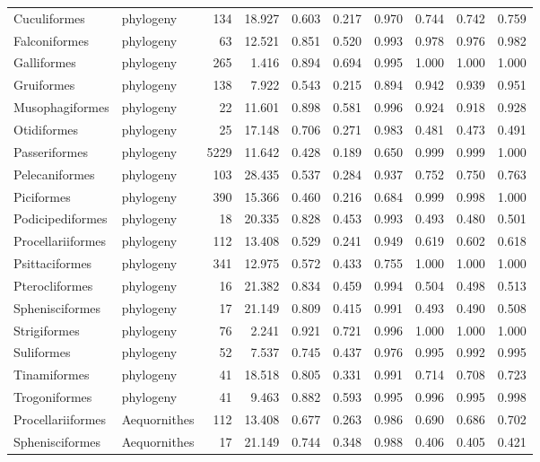 \begin{table}[ht]
\begin{tabular}{llrrrrrrrr}
  Cuculiformes & phylogeny &  134 & 18.927 & 0.603 & 0.217 & 0.970 & 0.744 & 0.742 & 0.759 \\ 
  Falconiformes & phylogeny &   63 & 12.521 & 0.851 & 0.520 & 0.993 & 0.978 & 0.976 & 0.982 \\ 
  Galliformes & phylogeny &  265 & 1.416 & 0.894 & 0.694 & 0.995 & 1.000 & 1.000 & 1.000 \\ 
  Gruiformes & phylogeny &  138 & 7.922 & 0.543 & 0.215 & 0.894 & 0.942 & 0.939 & 0.951 \\ 
  Musophagiformes & phylogeny &   22 & 11.601 & 0.898 & 0.581 & 0.996 & 0.924 & 0.918 & 0.928 \\ 
  Otidiformes & phylogeny &   25 & 17.148 & 0.706 & 0.271 & 0.983 & 0.481 & 0.473 & 0.491 \\ 
  Passeriformes & phylogeny & 5229 & 11.642 & 0.428 & 0.189 & 0.650 & 0.999 & 0.999 & 1.000 \\ 
  Pelecaniformes & phylogeny &  103 & 28.435 & 0.537 & 0.284 & 0.937 & 0.752 & 0.750 & 0.763 \\ 
  Piciformes & phylogeny &  390 & 15.366 & 0.460 & 0.216 & 0.684 & 0.999 & 0.998 & 1.000 \\ 
  Podicipediformes & phylogeny &   18 & 20.335 & 0.828 & 0.453 & 0.993 & 0.493 & 0.480 & 0.501 \\ 
  Procellariiformes & phylogeny &  112 & 13.408 & 0.529 & 0.241 & 0.949 & 0.619 & 0.602 & 0.618 \\ 
  Psittaciformes & phylogeny &  341 & 12.975 & 0.572 & 0.433 & 0.755 & 1.000 & 1.000 & 1.000 \\ 
  Pterocliformes & phylogeny &   16 & 21.382 & 0.834 & 0.459 & 0.994 & 0.504 & 0.498 & 0.513 \\ 
  Sphenisciformes & phylogeny &   17 & 21.149 & 0.809 & 0.415 & 0.991 & 0.493 & 0.490 & 0.508 \\ 
  Strigiformes & phylogeny &   76 & 2.241 & 0.921 & 0.721 & 0.996 & 1.000 & 1.000 & 1.000 \\ 
  Suliformes & phylogeny &   52 & 7.537 & 0.745 & 0.437 & 0.976 & 0.995 & 0.992 & 0.995 \\ 
  Tinamiformes & phylogeny &   41 & 18.518 & 0.805 & 0.331 & 0.991 & 0.714 & 0.708 & 0.723 \\ 
  Trogoniformes & phylogeny &   41 & 9.463 & 0.882 & 0.593 & 0.995 & 0.996 & 0.995 & 0.998 \\ 
  Procellariiformes & Aequornithes &  112 & 13.408 & 0.677 & 0.263 & 0.986 & 0.690 & 0.686 & 0.702 \\ 
  Sphenisciformes & Aequornithes &   17 & 21.149 & 0.744 & 0.348 & 0.988 & 0.406 & 0.405 & 0.421 \\ 

\end{tabular}
\end{table}
